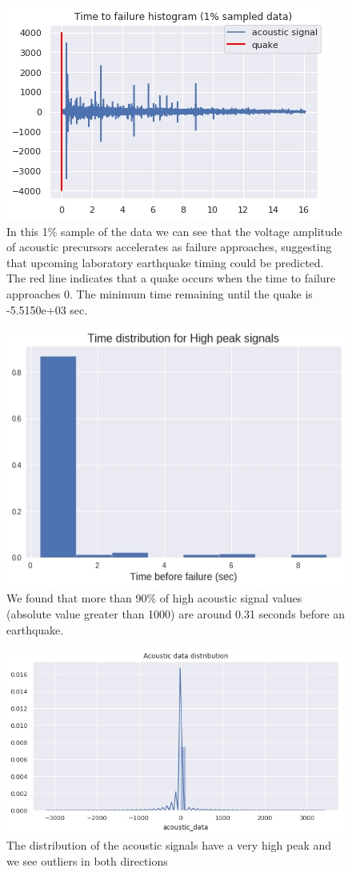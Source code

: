 \documentclass[]{llncs} %
\begin{document}
\begin{figure}
	\centering
	\includegraphics[width=.8\linewidth]{timeToFailureHistogram}
	\caption{In this 1\% sample of the data we can see that the voltage amplitude of acoustic precursors accelerates as failure approaches, suggesting that upcoming laboratory earthquake timing could be predicted. The red line indicates that a quake occurs when the time to failure approaches 0. The minimum time remaining until the quake is -5.5150e+03 sec.}
	\label{fig:timeToFailureHistogram}
\end{figure}
\begin{figure}
	\centering
	\includegraphics[width=.8\linewidth]{timeDistribution}
	\caption{We found that more than 90\% of high acoustic signal values (absolute value greater than 1000) are around 0.31 seconds before an earthquake.}
	\label{fig:timeDistribution}
\end{figure}
\begin{figure}
	\centering
	\includegraphics[width=.9\linewidth]{acousticDataDistribution}
	\caption{The distribution of the acoustic signals have a very high peak and we see outliers in both directions}
	\label{fig:acousticDataDistribution}
\end{figure}
\end{document}

